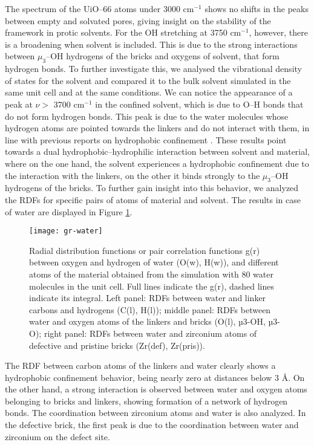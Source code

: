 The spectrum of the UiO--66 atoms under 3000 cm$^{-1}$ shows no shifts in the peaks between empty and solvated pores, giving insight on the stability of the framework in protic solvents. For the OH stretching at 3750 cm$^{-1}$, however, there is a broadening when solvent is included. This is due to the strong interactions between $\mu_3$--OH hydrogens of the bricks and oxygens of solvent, that form hydrogen bonds. To further investigate this, we analysed the vibrational density of states for the solvent and compared it to the bulk solvent simulated in the same unit cell and at the same conditions. We can notice the appearance of a peak at $\nu >$ 3700 cm$^{-1}$ in the confined solvent, which is due to O--H bonds that do not form hydrogen bonds. This peak is due to the water molecules whose hydrogen atoms are pointed towards the linkers and do not interact with them, in line with previous reports on hydrophobic confinement \cite{coudert2006dipole, dalla2016water, cicero2008water}. 
\npar
These results point towards a dual hydrophobic--hydrophilic interaction between solvent and material, where on the one hand, the solvent experiences a hydrophobic confinement due to the interaction with the linkers, on the other it binds strongly to the $\mu_3$--OH hydrogens of the bricks. To further gain insight into this behavior, we analyzed the RDFs for specific pairs of atoms of material and solvent. The results in case of water are displayed in Figure \ref{fig:gr-water}. 
\begin{figure}[!htb]
	\centering
	\texttt{[image: gr-water]}
	\caption{Radial distribution functions or pair correlation functions g(r) between oxygen and hydrogen of water (O(w), H(w)), and different atoms of the material obtained from the simulation with 80 water molecules in the unit cell. Full lines indicate the g(r), dashed lines indicate its integral. Left panel: RDFs between water and linker carbons and hydrogens (C(l), H(l)); middle panel: RDFs between water and oxygen atoms of the linkers and bricks (O(l), µ3-OH, µ3-O); right panel: RDFs between water and zirconium atoms of defective and pristine bricks (Zr(def), Zr(pris)). }
	\label{fig:gr-water}
\end{figure}
\npar
The RDF between carbon atoms of the linkers and water clearly shows a hydrophobic confinement behavior, being nearly zero at distances below 3 \AA. On the other hand, a strong interaction is observed between water and oxygen atoms belonging to bricks and linkers, showing formation of a network of hydrogen bonds. The coordination between zirconium atoms and water is also analyzed. In the defective brick, the first peak is due to the coordination between water and zirconium on the defect site. 
